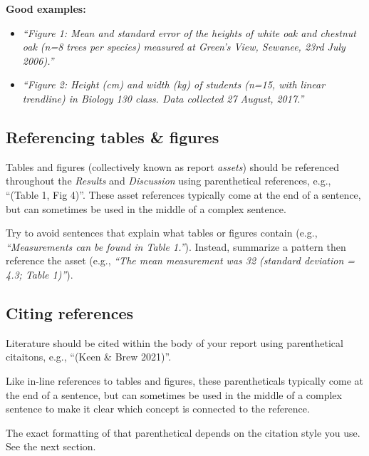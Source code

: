 \documentclass[
]{book}
\begin{document}
\textbf{Good examples:}

\begin{itemize}
\item
  \emph{``Figure 1: Mean and standard error of the heights of white oak and chestnut oak (n=8 trees per species) measured at Green's View, Sewanee, 23rd July 2006).''}
\item
  \emph{``Figure 2: Height (cm) and width (kg) of students (n=15, with linear trendline) in Biology 130 class. Data collected 27 August, 2017.''}
\end{itemize}

\hypertarget{referencing-tables-figures}{%
\subsection*{Referencing tables \& figures}\label{referencing-tables-figures}}

Tables and figures (collectively known as report \emph{assets}) should be referenced throughout the \emph{Results} and \emph{Discussion} using parenthetical references, e.g., ``(Table 1, Fig 4)''. These asset references typically come at the end of a sentence, but can sometimes be used in the middle of a complex sentence.

Try to avoid sentences that explain what tables or figures contain (e.g., \emph{``Measurements can be found in Table 1.''}). Instead, summarize a pattern then reference the asset (e.g., \emph{``The mean measurement was 32 (standard deviation = 4.3; Table 1)''}).

\hypertarget{citing-references}{%
\subsection*{Citing references}\label{citing-references}}

Literature should be cited within the body of your report using parenthetical citaitons, e.g., ``(Keen \& Brew 2021)''.

Like in-line references to tables and figures, these parentheticals typically come at the end of a sentence, but can sometimes be used in the middle of a complex sentence to make it clear which concept is connected to the reference.

The exact formatting of that parenthetical depends on the citation style you use. See the next section.
\end{document}

